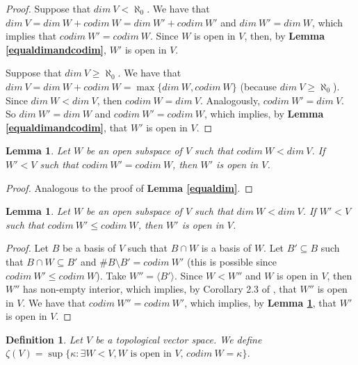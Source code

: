 \documentclass[a4paper,12pt]{article}
\newtheorem{defi}[prop]{Definition}
\newtheorem{lema}[prop]{Lemma}
\theoremstyle{bloco}
\begin{document}
\begin{proof}Suppose that $dim \ V < \aleph_{0}$. We have that $dim \ V = dim \ W + codim \ W =  dim \ W' + codim \ W'$ and $dim \ W' = dim \ W$, which implies that  $codim \ W' = codim \ W$. Since $W$ is open in $V$, then, by \textbf{Lemma \ref{equaldimandcodim}}, $W'$ is open in $V$.

Suppose that $dim \ V \geqslant \aleph_{0}$. We have that $dim \ V = dim \ W + codim \ W = \max\{dim \ W, codim \ W\}$ (because $dim \ V \geqslant \aleph_{0}$). Since $dim \ W < dim \ V$, then $codim \ W = dim \ V $. Analogously, $codim \ W' = dim \ V $. So $dim \ W' = dim \ W$ and $codim \ W' = codim \ W$, which implies, by \textbf{Lemma \ref{equaldimandcodim}}, that $W'$ is open in $V$.
\end{proof}

\begin{lema}\label{equalcodim}Let $W$ be an open subspace of $V$ such that $codim \ W < dim \ V$. If $W' < V$ such that $codim \ W' = codim \ W$, then $W'$ is open in $V$. 
\end{lema}

\begin{proof}Analogous to the proof of \textbf{Lemma \ref{equaldim}}.
\end{proof}

\begin{lema}\label{smallercodim}Let $W$ be an open subspace of $V$ such that $dim \ W < dim \ V$. If $W' < V$ such that $codim \ W' \leqslant codim \ W$, then $W'$ is open in $V$. 
\end{lema}

\begin{proof}Let $B$ be a basis of $V$ such that $B \cap W$ is a basis of $W$. Let $B' \subseteq B$ such that $B \cap W \subseteq B'$ and $\# B\setminus B' = codim \ W'$ (this is possible since $codim \ W' \leqslant codim \ W$). Take $W'' = \langle B' \rangle$. Since  $W < W''$ and $W$ is open in $V$, then $W''$ has non-empty interior, which implies, by Corollary 2.3 of \cite{Wa}, that $W''$ is open in $V$. We have that $codim \ W'' = codim \ W'$, which implies, by \textbf{Lemma \ref{equalcodim}}, that $W'$ is open in $V$.
\end{proof}

\begin{defi}Let $V$ be a topological vector space. We define $\zeta(V) = \sup\{\kappa: \exists W < V, W \text{ is open in $V$, } codim \ W = \kappa \}$.
\end{defi}
\end{document}

